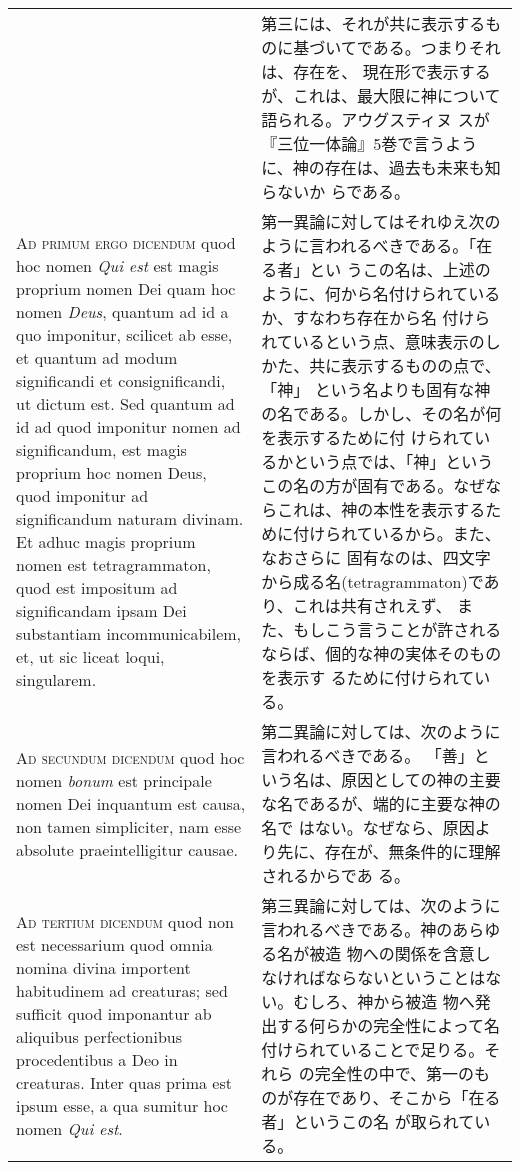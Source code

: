 \documentclass[10pt]{jsarticle} %
\begin{document}
\begin{longtable}{p{21em}p{21em}}
&

第三には、それが共に表示するものに基づいてである。つまりそれは、存在を、
現在形で表示するが、これは、最大限に神について語られる。アウグスティヌ
スが『三位一体論』5巻で言うように、神の存在は、過去も未来も知らないか
らである。


\\


{\scshape Ad primum ergo dicendum} quod hoc nomen {\itshape Qui est} est
magis proprium nomen Dei quam hoc nomen {\itshape Deus}, quantum ad id a
quo imponitur, scilicet ab esse, et quantum ad modum significandi et
consignificandi, ut dictum est. Sed quantum ad id ad quod imponitur
nomen ad significandum, est magis proprium hoc nomen Deus, quod
imponitur ad significandum naturam divinam. Et adhuc magis proprium
nomen est tetragrammaton, quod est impositum ad significandam ipsam Dei
substantiam incommunicabilem, et, ut sic liceat loqui, singularem.


&

第一異論に対してはそれゆえ次のように言われるべきである。「在る者」とい
うこの名は、上述のように、何から名付けられているか、すなわち存在から名
付けられているという点、意味表示のしかた、共に表示するものの点で、「神」
という名よりも固有な神の名である。しかし、その名が何を表示するために付
けられているかという点では、「神」というこの名の方が固有である。なぜな
らこれは、神の本性を表示するために付けられているから。また、なおさらに
固有なのは、四文字から成る名(tetragrammaton)であり、これは共有されえず、
また、もしこう言うことが許されるならば、個的な神の実体そのものを表示す
るために付けられている。

\\


{\scshape Ad secundum dicendum} quod hoc nomen {\itshape bonum}
est principale nomen Dei inquantum est causa, non tamen simpliciter, nam
esse absolute praeintelligitur causae.


&

第二異論に対しては、次のように言われるべきである。
「善」という名は、原因としての神の主要な名であるが、端的に主要な神の名で
 はない。なぜなら、原因より先に、存在が、無条件的に理解されるからであ
 る。

\\


{\scshape Ad tertium dicendum} quod non est necessarium
quod omnia nomina divina importent habitudinem ad creaturas; sed
sufficit quod imponantur ab aliquibus perfectionibus procedentibus a Deo
in creaturas. Inter quas prima est ipsum esse, a qua sumitur hoc nomen
{\itshape Qui est}.


&

第三異論に対しては、次のように言われるべきである。神のあらゆる名が被造
物への関係を含意しなければならないということはない。むしろ、神から被造
物へ発出する何らかの完全性によって名付けられていることで足りる。それら
の完全性の中で、第一のものが存在であり、そこから「在る者」というこの名
が取られている。


\end{longtable}
\end{document}
